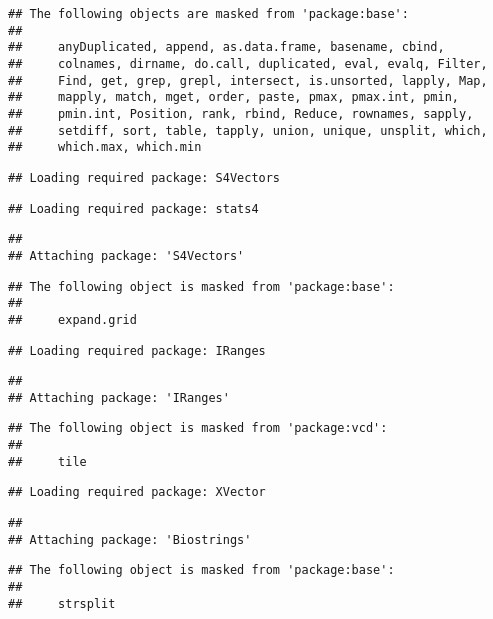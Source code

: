 \documentclass[]{article}
\begin{document}
\begin{verbatim}
## The following objects are masked from 'package:base':
## 
##     anyDuplicated, append, as.data.frame, basename, cbind,
##     colnames, dirname, do.call, duplicated, eval, evalq, Filter,
##     Find, get, grep, grepl, intersect, is.unsorted, lapply, Map,
##     mapply, match, mget, order, paste, pmax, pmax.int, pmin,
##     pmin.int, Position, rank, rbind, Reduce, rownames, sapply,
##     setdiff, sort, table, tapply, union, unique, unsplit, which,
##     which.max, which.min
\end{verbatim}

\begin{verbatim}
## Loading required package: S4Vectors
\end{verbatim}

\begin{verbatim}
## Loading required package: stats4
\end{verbatim}

\begin{verbatim}
## 
## Attaching package: 'S4Vectors'
\end{verbatim}

\begin{verbatim}
## The following object is masked from 'package:base':
## 
##     expand.grid
\end{verbatim}

\begin{verbatim}
## Loading required package: IRanges
\end{verbatim}

\begin{verbatim}
## 
## Attaching package: 'IRanges'
\end{verbatim}

\begin{verbatim}
## The following object is masked from 'package:vcd':
## 
##     tile
\end{verbatim}

\begin{verbatim}
## Loading required package: XVector
\end{verbatim}

\begin{verbatim}
## 
## Attaching package: 'Biostrings'
\end{verbatim}

\begin{verbatim}
## The following object is masked from 'package:base':
## 
##     strsplit
\end{verbatim}
\end{document}
